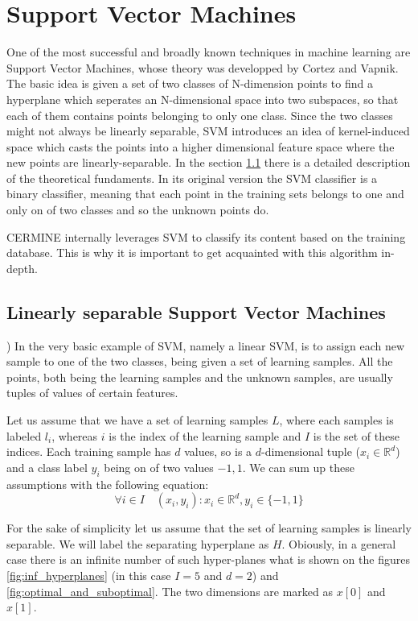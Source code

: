 \section{Support Vector Machines}\label{sec:svm}
One of the most successful and broadly known techniques in machine learning are Support Vector Machines, whose theory was developped by Cortez and Vapnik. The basic idea is given a set of two classes of N-dimension points to find a hyperplane which seperates an N-dimensional space into two subspaces, so that each of them contains points belonging to only one class. Since the two classes might not always be linearly separable, SVM introduces an idea of kernel-induced space which casts the points into a higher dimensional feature space where the new points are linearly-separable. In the section \ref{subsec:linear_svm} there is a detailed description of the theoretical fundaments. In its original version the SVM classifier is a binary classifier, meaning that each point in the training sets belongs to one and only on of two classes and so the unknown points do.

CERMINE internally leverages SVM to classify its content based on the training database. This is why it is important to get acquainted with this algorithm in-depth. 

\subsection{Linearly separable Support Vector Machines} \label{subsec:linear_svm})
In the very basic example of SVM, namely a linear SVM, is to assign each new sample to one of the two classes, being given a set of learning samples. All the points, both being the learning samples and the unknown samples, are usually tuples of values of certain features.

Let us assume that we have a set of learning samples $L$, where each samples is labeled $l_i$, whereas $i$ is the index of the learning sample and $I$ is the set of these indices. Each training sample has $d$ values, so is a $d$-dimensional tuple ($x_i \in \mathbb{R}^d$) and a class label $y_i$ being on of two values ${-1, 1}$. We can sum up these assumptions with the following equation:
\begin{equation}
\forall{i \in I} \quad \left(x_i, y_i\right) : x_i \in \mathbb{R}^d, y_i \in \{-1, 1\}
\end{equation} 

For the sake of simplicity let us assume that the set of learning samples is linearly separable. We will label the separating hyperplane as $H$. Obiously, in a general case there is an infinite number of such hyper-planes what is shown on the figures \ref{fig:inf_hyperplanes} (in this case $I=5$ and $d=2$) and \ref{fig:optimal_and_suboptimal}. The two dimensions are marked as $x[0]$ and $x[1]$.

